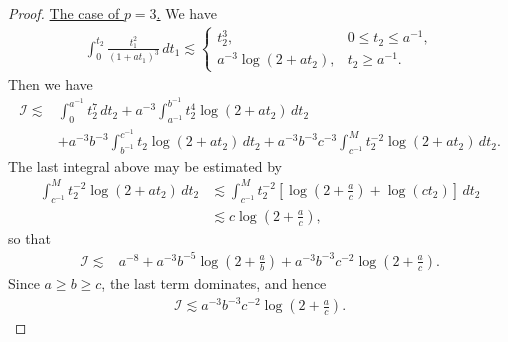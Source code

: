 \documentclass[10pt,a4paper]{amsart}
\begin{document}
\begin{proof}
\underline{The case of $p=3$.} We have
\begin{align*}
\int_0^{t_2}\frac{t_1^2}{(1+at_1)^3}\,dt_1
\lesssim
\begin{cases}
t_2^3, & 0\le t_2\le a^{-1},\\[4pt]
a^{-3}\log(2+at_2), & t_2\ge a^{-1}.
\end{cases}
\end{align*}
Then we have 
\begin{align*}
    \mathcal{I}
    \lesssim &\int_0^{a^{-1}}t_2^7\, dt_2
    +a^{-3}\int_{a^{-1}}^{b^{-1}}t_2^4\log(2+at_2)\, dt_2\\
    &+a^{-3}b^{-3}\int_{b^{-1}}^{c^{-1}}t_2\log(2+at_2)\, dt_2
    +a^{-3}b^{-3}c^{-3}\int_{c^{-1}}^{M}t_2^{-2}\log(2+at_2)\, dt_2.
\end{align*}
The last integral above may be estimated by 
\begin{align*}
 \int_{c^{-1}}^{M}t_2^{-2}\log(2+at_2)\,dt_2&
 \lesssim \int_{c^{-1}}^{M}t_2^{-2}\left[\log\left(2+\frac ac\right)+\log(ct_2)\right] \,dt_2\\
 &\lesssim c\log\left(2+\frac ac\right),
\end{align*}
so that 
\begin{align*}
    \mathcal{I}
    \lesssim &  a^{-8}+a^{-3}b^{-5}\log\left(2+\frac ab\right)
    +a^{-3}b^{-3}c^{-2}\log\left(2+\frac ac\right).
\end{align*}
Since $a\ge b\ge c$, the last term dominates, and hence
\begin{align*}
\mathcal I
\lesssim a^{-3}b^{-3}c^{-2}\log\!\left(2+\frac ac\right).
\end{align*}


\end{proof}
\end{document}
